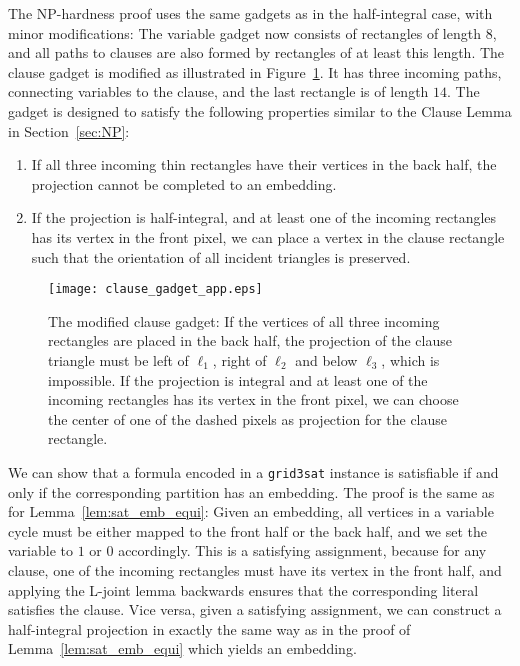 \documentclass[12pt]{article}
\begin{document}
\begin{appendix}
The NP-hardness proof uses the same gadgets as in the half-integral case,
with minor modifications: The variable gadget now consists of rectangles of length $8$,
and all paths to clauses are also formed by rectangles of at least this length.
The clause gadget is modified as illustrated in Figure~\ref{fig:clause-gadget-mod}.
It has three incoming paths, connecting variables to the clause, and the last rectangle
is of length $14$. The gadget is designed to satisfy the following properties 
similar to the Clause Lemma in Section~\ref{sec:NP}:
\begin{enumerate}
\item If all three incoming thin rectangles have their vertices in the back half,
      the projection cannot be completed to an embedding.
\item If the projection is half-integral, and at least one of the incoming rectangles
      has its vertex in the front pixel, we can place a vertex in the clause rectangle
      such that the orientation of all incident triangles is preserved.
\end{enumerate}


\begin{figure}
\begin{center}
\texttt{[image: clause\_gadget\_app.eps]}
\end{center}
\caption{The modified clause gadget: If the vertices of all three incoming rectangles are placed in
the back half, the projection of the clause triangle must be left of $\ell_1$, right of $\ell_2$
and below $\ell_3$, which is impossible. If the projection is integral and at least one of the
incoming rectangles has its vertex in the front pixel, we can choose the center of one of the dashed
pixels as projection for the clause rectangle.}
\label{fig:clause-gadget-mod}
\end{figure}
We can show that a formula encoded in a \texttt{grid3sat} instance is satisfiable
if and only if the corresponding partition has an embedding.
The proof is the same as for Lemma~\ref{lem:sat_emb_equi}: Given an embedding,
all vertices in a variable cycle must be either mapped to the front half or
the back half, and we set the variable to $1$ or $0$ accordingly. 
This is a satisfying assignment, because for any clause, one of the incoming 
rectangles must have its vertex in the front half, and applying the L-joint lemma
backwards ensures that the corresponding literal satisfies the clause.
Vice versa, given a satisfying assignment, we can construct a half-integral
projection in exactly the same way as in the proof of Lemma~\ref{lem:sat_emb_equi}
which yields an embedding.


\end{appendix}
\end{document}
